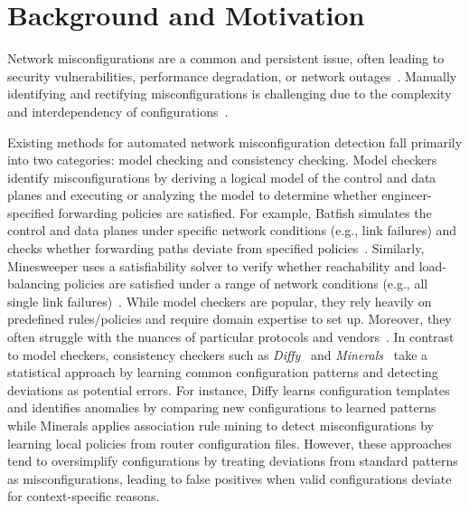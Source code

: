 \section{Background and Motivation}
\label{sec_background}
Network misconfigurations are a common and persistent issue, often leading to security vulnerabilities, performance degradation, or network outages~\cite{zheng2012atpg, feamster2005detecting}. Manually identifying and rectifying  misconfigurations is challenging due to the complexity and interdependency of configurations~\cite{le2007rr, benson2009complexitymetrics}.

Existing methods for automated network misconfiguration detection fall primarily into two categories: model checking and consistency checking. Model checkers~\cite{fogel2015general, beckett2017general, abhashkumar2020tiramisu, prabhu2020plankton, zhang2022sre, steffen2020netdice, ye2020hoyan, ritchey2000using,al2011configchecker, jeffrey2009model} identify misconfigurations by deriving a logical model of the control and data planes and executing or analyzing the model to determine whether engineer-specified forwarding policies are satisfied.
For example, Batfish simulates the control and data planes under specific network conditions (e.g., link failures) and checks whether forwarding paths deviate from specified policies~\cite{fogel2015general}. Similarly, Minesweeper uses a satisfiability solver to verify whether reachability and load-balancing policies are satisfied under a range of network conditions (e.g., all single link failures)~\cite{beckett2017general}.
While model checkers are popular, they rely heavily on predefined rules/policies and require domain expertise to set up. Moreover, they often struggle with the nuances of particular protocols and vendors~\cite{ye2020hoyan, birkner2021metha}.
In contrast to model checkers, consistency checkers such as \textit{Diffy}~\cite{kakarla2024diffy} and \textit{Minerals}~\cite{le2006minerals} take a statistical approach by learning common configuration patterns and detecting deviations as potential errors.
For instance, Diffy learns configuration templates and identifies anomalies by comparing new configurations to learned patterns while Minerals applies association rule mining to detect misconfigurations by learning local policies from router configuration files. However, these approaches tend to oversimplify configurations by treating deviations from standard patterns as misconfigurations, leading to false positives when valid configurations deviate for context-specific reasons.


